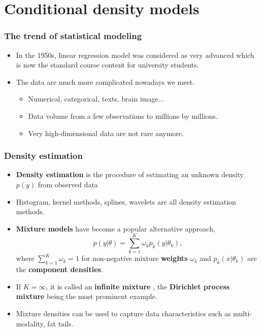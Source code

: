 \documentclass[11pt]{beamer}
\begin{document}
\section{Conditional density models}
\begin{frame}
  \frametitle{The trend of statistical modeling}

  \begin{itemize}
  \item In the 1950s, linear regression model  was considered as very advanced
    which is now the standard course content for university students.
  \item The data are much more complicated nowadays we meet.
    \begin{itemize}
    \item Numerical, categorical, texts, brain image...
    \item Data volume from a few observations to millions by millions.
    \item Very high-dimensional data are not rare anymore.
    \end{itemize}
  \end{itemize}
\end{frame}


\begin{frame}
  \frametitle{Density estimation}
  \begin{itemize}
  \item \textbf{Density estimation} is the procedure of estimating an unknown density
    $p(y)$ from observed data

  \item Histogram, kernel methods, splines, wavelets are all density estimation
    methods.

  \item \textbf{Mixture models} \citep{jiang1999approximation} have become a popular alternative approach,
    \[
    p(y|\theta)=\sum\limits _{k=1}^{K}\omega_{k}p_{k}(y|\theta_{k}),
    \]
    where $\sum\nolimits _{k=1}^{K}\omega_{k}=1$ for non-negative mixture
    \textbf{weights} $\omega_{k}$ and $p_{k}(x|\theta_{k})$ are the \textbf{
      component densities}.

  \item If $K=\infty$, it is called an \textbf{infinite mixture} \citep{escobar1994estimating}, the
    \textbf{Dirichlet process mixture} being the most prominent example.

  \item Mixture densities can be used to capture data characteristics such as
    multi-modality, fat tails.

  \end{itemize}

\end{frame}
\end{document}
